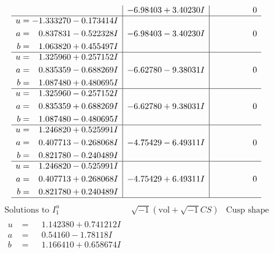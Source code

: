 \documentclass[1p]{elsarticle_modified}
\theoremstyle{definition}
\newcommand{\I}{\sqrt{-1}}
\begin{document}
$$\begin{array}{c|c|c}
 & -6.98403 + 3.40230 I & \phantom{-0.000000 } 0 \\ \hline\begin{aligned}
u &= -1.333270 - 0.173414 I \\
a &= \phantom{-}0.837831 - 0.522328 I \\
b &= \phantom{-}1.063820 + 0.455497 I\end{aligned}
 & -6.98403 - 3.40230 I & \phantom{-0.000000 } 0 \\ \hline\begin{aligned}
u &= \phantom{-}1.325960 + 0.257152 I \\
a &= \phantom{-}0.835359 - 0.688269 I \\
b &= \phantom{-}1.087480 + 0.480695 I\end{aligned}
 & -6.62780 - 9.38031 I & \phantom{-0.000000 } 0 \\ \hline\begin{aligned}
u &= \phantom{-}1.325960 - 0.257152 I \\
a &= \phantom{-}0.835359 + 0.688269 I \\
b &= \phantom{-}1.087480 - 0.480695 I\end{aligned}
 & -6.62780 + 9.38031 I & \phantom{-0.000000 } 0 \\ \hline\begin{aligned}
u &= \phantom{-}1.246820 + 0.525991 I \\
a &= \phantom{-}0.407713 - 0.268068 I \\
b &= \phantom{-}0.821780 - 0.240489 I\end{aligned}
 & -4.75429 - 6.49311 I & \phantom{-0.000000 } 0 \\ \hline\begin{aligned}
u &= \phantom{-}1.246820 - 0.525991 I \\
a &= \phantom{-}0.407713 + 0.268068 I \\
b &= \phantom{-}0.821780 + 0.240489 I\end{aligned}
 & -4.75429 + 6.49311 I & \phantom{-0.000000 } 0\\
 \hline 
 \end{array}$$\newpage$$\begin{array}{c|c|c}  
\text{Solutions to }I^u_{1}& \I (\text{vol} + \sqrt{-1}CS) & \text{Cusp shape}\\
 \hline 
\begin{aligned}
u &= \phantom{-}1.142380 + 0.741212 I \\
a &= \phantom{-}0.54160 - 1.78118 I \\
b &= \phantom{-}1.166410 + 0.658674 I\end{aligned}

\end{array}$$
\end{document}
